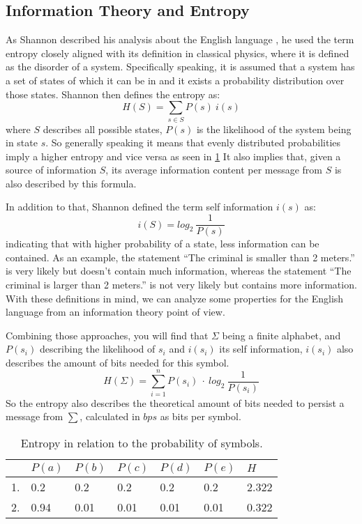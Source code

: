 \subsection{Information Theory and Entropy}
\par{
As Shannon described his analysis about the English language \cite{entropy}, he used the term entropy closely aligned with its definition in classical physics, where it is defined as the disorder of a system. Specifically speaking, it is assumed that a system has a set of states of which it can be in and it exists a probability distribution over those states. Shannon then defines the entropy as:
\[
H(S) = \sum_{s \in S} P(s) \: i(s)
\]
where $S$ describes all possible states, $P(s)$ is the likelihood of the system being in state $s$. So generally speaking it means that evenly distributed probabilities imply a higher entropy and vice versa as seen in \ref{tab:heisetabelle}
It also implies that, given a source of information $S$, its average information content per message from $S$ is also described by this formula.}

\par{
In addition to that, Shannon defined the term self information $i(s)$ as:
\[
i(S) = log_{2} \: \frac{1}{P(s)}
\]
indicating that with higher probability of a state, less information can be contained. As an example, the statement \enquote{The criminal is smaller than 2 meters.} is very likely but doesn't contain much information, whereas the statement \enquote{The criminal is larger than 2 meters.} is not very likely but contains more information. With these definitions in mind, we can analyze some properties for the English language from an information theory point of view.
}

\par{
Combining those approaches, you will find that $\Sigma$ being a finite alphabet, and $P(s_i)$ describing the likelihood of $s_i$ and $i(s_i)$ its self information, $i(s_i)$ also describes the amount of bits needed for this symbol.
\[
	H(\Sigma) = \sum_{i = 1}^{n} P(s_i) \: \cdot \: log_{2} \: \frac{1}{P(s_i) }
\]
So the entropy 	also describes the theoretical amount of bits needed to persist a message from $\sum$, calculated in $bps$ as bits per symbol.

\begin{table}
	\centering
\begin{tabular}[p]{l|l|l|l|l|l|l}
	& $P(a)$ & $P(b)$ & $P(c)$ & $P(d)$ & $P(e)$ & $H$ \\
	\hline
	1. & 0.2 & 0.2 & 0.2 & 0.2 & 0.2 & 2.322 \\
	2. & 0.94 & 0.01 & 0.01 & 0.01 & 0.01 & 0.322
	\label{tab:heisetabelle}
\end{tabular}
	\caption{Entropy in relation to the probability of symbols.}
\end{table}
}

